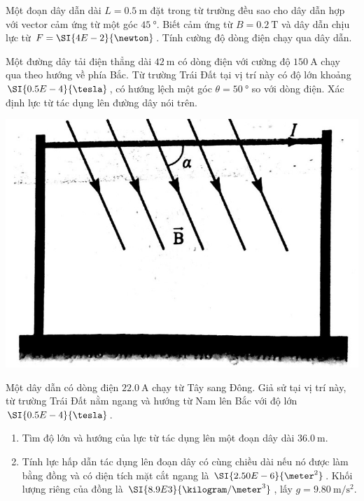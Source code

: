 \begin{ex}
Một đoạn dây dẫn dài $L=\SI{0.5}{\meter}$ đặt trong từ trường đều sao cho dây dẫn hợp với vector cảm ứng từ một góc $\SI{45}{\degree}$. Biết cảm ứng từ $B=\SI{0.2}{\tesla}$ và dây dẫn chịu lực từ $F=\SI{4E-2}{\newton}$. Tính cường độ dòng điện chạy qua dây dẫn.
\end{ex}
\begin{ex}
Một đường dây tải điện thẳng dài $\SI{42}{\meter}$ có dòng điện với cường độ $\SI{150}{\ampere}$ chạy qua theo hướng về phía Bắc. Từ trường Trái Đất tại vị trí này có độ lớn khoảng $\SI{0.5E-4}{\tesla}$, có hướng lệch một góc $\theta=\SI{50}{\degree}$ so với dòng điện. Xác định lực từ tác dụng lên đường dây nói trên.
\begin{center}
	\includegraphics[width=0.4\linewidth]{../figs/VN12-Y24-PH-SYL-018P-7}
\end{center}
\end{ex}
\begin{ex}
Một dây dẫn có dòng điện $\SI{22.0}{\ampere}$ chạy từ Tây sang Đông. Giả sử tại vị trí này, từ trường Trái Đất nằm ngang và hướng từ Nam lên Bắc với độ lớn $\SI{0.5E-4}{\tesla}$.
\begin{enumerate}[label=\alph*)]
	\item Tìm độ lớn và hướng của lực từ tác dụng lên một đoạn dây dài $\SI{36.0}{\meter}$.
	\item Tính lực hấp dẫn tác dụng lên đoạn dây có cùng chiều dài nếu nó được làm bằng đồng và có diện tích mặt cắt ngang là $\SI{2.50E-6}{\meter^2}$. Khối lượng riêng của đồng là $\SI{8.9E3}{\kilogram/\meter^3}$, lấy $g=\SI{9.80}{\meter/\second^2}$.
\end{enumerate}
\end{ex}
